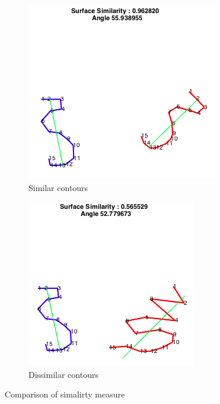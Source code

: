 \documentclass[
    floatsintext
]{article}
\begin{document}
\begin{figure}[h]
  \centering
  \begin{subfigure}{.5\textwidth}
    \includegraphics[width=1\linewidth]{./figures/correlation_2D.png}
    \caption{Similar contours}
    \label{fig:correlation_2D}
  \end{subfigure}
  \begin{subfigure}{.44\textwidth}
    \includegraphics[width=1\linewidth]{./figures/no_correlation_2D.png}
    \caption{Dissimilar contours}
    \label{fig:no_correlation_2D}
  \end{subfigure}
  \caption{Comparison of simalirty measure}
\end{figure}
\end{document}
